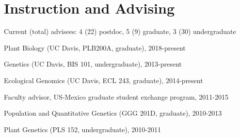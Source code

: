 \documentclass[letterpaper,10pt]{article}
\renewenvironment{itemize}{
  \begin{list}{}{
    \setlength{\leftmargin}{1.5em}
  }
}{
  \end{list}
}
\begin{document}
\section*{Instruction and Advising}
\begin{itemize}
\setlength\itemsep{0ex}
\item Current (total) advisees: 4 (22) postdoc, 5 (9) graduate, 3 (30) undergraduate



\item Plant Biology (UC Davis, PLB200A, graduate), 2018-present
\item Genetics (UC Davis, BIS 101, undergraduate), 2013-present
\item Ecological Genomics (UC Davis, ECL  243, graduate), 2014-present
\item Faculty advisor, US-Mexico graduate student exchange program, 2011-2015
\item Population and Quantitative Genetics (GGG 201D, graduate), 2010-2013 %
\item Plant Genetics (PLS 152, undergraduate), 2010-2011 %

\end{itemize}
\end{document}
